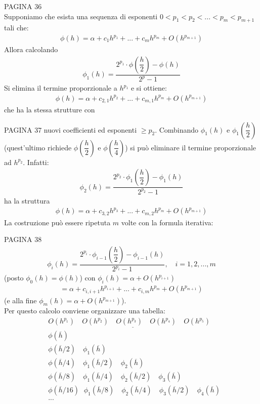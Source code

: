 \documentclass[12pt,a4paper]{article}
\begin{document}
PAGINA 36 %
\\
Supponiamo che esista una sequenza di esponenti $ 0<p_1<p_2<...<p_m<p_{m+1}$ tali che:
\[ \begin{split}
	\phi(h)=\alpha+c_1h^{p_1}+...+c_mh^{p_m}+O(h^{p_{m+1}})
\end{split} \]
Allora calcolando
\[ \begin{split}
	\phi_1(h)=\dfrac{2^{p_1}\cdot \phi\left( \dfrac{h}{2} \right)-\phi (h) }{2^p-1}
\end{split} \]
Si elimina il termine proporzionale a $h^{p_1}$ e si ottiene:
\[ \begin{split}
	\phi(h)=\alpha+c_{2,1}h^{p_2}+...+c_{m,1}h^{p_m}+O(h^{p_{m+1}})
\end{split} \]
che ha la stessa strutture con


PAGINA 37 %
nuovi coefficienti ed esponenti $\geq p_2$. Combinando $\phi_1(h)$ e $\phi_1 \left( \dfrac{h}{2} \right)$ (quest'ultimo richiede $\phi \left( \dfrac{h}{2} \right)$ e $\phi \left( \dfrac{h}{4} \right)$) si può eliminare il termine proporzionale ad $h^{p_2}$. Infatti:
\[ \begin{split}
	\phi_2(h)=\dfrac{2^{p_2}\cdot \phi_1\left( \dfrac{h}{2} \right) -\phi_1 (h)}{2^{p_2}-1}
\end{split} \]
ha la struttura
\[ \begin{split}
	\phi(h)=\alpha+c_{3,2}h^{p_3}+...+c_{m,2}h^{p_m}+O(h^{p_{m+1}})
\end{split} \]
La costruzione può essere ripetuta $m$ volte con la formula iterativa:


PAGINA 38 %
\[ \begin{split}
	\phi_i(h)=\dfrac{2^{p_i}\cdot \phi_{i-1} \left( \dfrac{h}{2} \right) -\phi_{i-1} (h)}{2^{p_i}-1}, \quad i=1,2,...,m
\end{split} \]
(posto $\phi_0(h)=\phi(h)$) con  $\phi_i(h)=\alpha + O(h^{p_{i+1}})$
\[ \begin{split}
	=\alpha+c_{i,i+1}h^{p_{i+1}}+...+c_{i,m}h^{p_m}+O(h^{p_{m+1}})
\end{split} \]
(e alla fine $\phi_m(h)=\alpha + O(h^{p_{m+1}})$).\\
Per questo calcolo conviene organizzare una tabella:
\[ \begin{split}
	& \underline{O(h^{p_{1}}) \quad O(h^{p_{2}}) \quad O(h^{p_{3}}) \quad O(h^{p_{4}}) \quad O(h^{p_{5}}) \quad} \\
	& \phi(\overline{h})\\
	& \phi (\overline{h}/2) \quad \phi_1 (\overline{h})\\
	& \phi (\overline{h}/4) \quad \phi_1 (\overline{h}/2) \quad \phi_2 (\overline{h})\\
	& \phi (\overline{h}/8) \quad \phi_1 (\overline{h}/4) \quad \phi_2 (\overline{h}/2) \quad \phi_3 (\overline{h})\\
	& \phi (\overline{h}/16) \; \, \, \phi_1 (\overline{h}/8) \quad \phi_2 (\overline{h}/4) \quad \phi_3 (\overline{h}/2) \quad \phi_4 (\overline{h})\\
	& ... 
\end{split} \]
\end{document}
